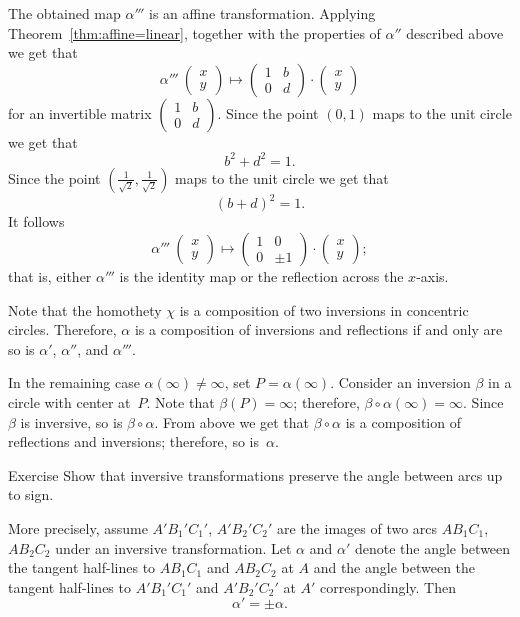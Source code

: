 The obtained map $\alpha'''$ is an affine transformation.
Applying Theorem~\ref{thm:affine=linear}, together with the properties of $\alpha''$ described above we get that
\[\alpha'''\:\left(\begin{smallmatrix}
x\\ y
\end{smallmatrix} \right)
  \mapsto
  \left(\begin{smallmatrix}
1&b\\ 0&d
\end{smallmatrix} \right)
  \cdot
  \left(\begin{smallmatrix}
x\\ y
\end{smallmatrix} \right)
\]
for an invertible matrix $\left(\begin{smallmatrix}
1&b\\ 0&d
\end{smallmatrix} \right)$.
Since the point $(0,1)$ maps to the unit circle we get that 
\[b^2+d^2=1.\]
Since the point $(\tfrac1{\sqrt{2}},\tfrac1{\sqrt{2}})$ maps to the unit circle we get that 
\[(b+d)^2=1.\]
It follows 
\[\alpha'''\:\left(\begin{smallmatrix}
x\\ y
\end{smallmatrix} \right)
  \mapsto
  \left(\begin{smallmatrix}
1&0\\ 0&\pm1
\end{smallmatrix} \right)
\cdot
\left(\begin{smallmatrix}
x
\\ 
y
\end{smallmatrix} \right);
\]
that is, either $\alpha'''$ is the identity map or the reflection across the $x$-axis.

Note that the homothety $\chi$ is a composition of two inversions in concentric circles.
Therefore, $\alpha$ is a composition of inversions and reflections if and only are so is $\alpha'$, $\alpha''$, and $\alpha'''$.

In the remaining case $\alpha(\infty)\ne \infty$, set $P=\alpha(\infty)$.
Consider an inversion $\beta$ in a circle with center at~$P$.
Note that $\beta(P)=\infty$; 
therefore, $\beta\circ\alpha(\infty)=\infty$.
Since $\beta$ is inversive, so is $\beta\circ\alpha$.
From above we get that $\beta\circ\alpha$ is a composition of reflections and inversions;
therefore, so is~$\alpha$.
\qeds

\begin{thm}{Exercise}\label{ex:inversive-angle}
Show that inversive transformations preserve the angle between arcs up to sign.

More precisely, assume $A'B_1'C_1'$, $A'B_2'C_2'$ are the images of two arcs $AB_1C_1$, $AB_2C_2$ under an inversive transformation.
Let $\alpha$ and $\alpha'$ denote the angle between the tangent half-lines to $AB_1C_1$ and $AB_2C_2$ at $A$
and the angle between the tangent half-lines to $A'B_1'C_1'$ and $A'B_2'C_2'$ at $A'$ correspondingly.
Then 
\[\alpha'=\pm \alpha.\]
\end{thm}


